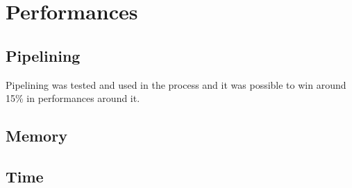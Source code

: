 \section{Performances}

   \subsection{Pipelining}

   Pipelining was tested and used in the process and it was possible to
   win around 15\% in performances around it.

   \subsection{Memory}

   \subsection{Time}


